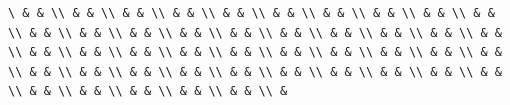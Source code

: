\documentclass[
  ukrainian,
]{article}
\begin{document}
\begin{verbatim}
\ & & \\ & & \\ & & \\ & & \\ & & \\ & & \\ & & \\ & & \\ & & \\ & & \\ & & \\ & & \\ & & \\ & & \\ & & \\ & & \\ & & \\ & & \\ & & \\ & & \\ & & \\ & & \\ & & \\ & & \\ & & \\ & & \\ & & \\ & & \\ & & \\ & & \\ & & \\ & & \\ & & \\ & & \\ & & \\ & & \\ & & \\ & & \\ & & \\ & & \\ & & \\ & & \\ & & \\ & & \\ & & \\ & 
\end{verbatim}
\end{document}
